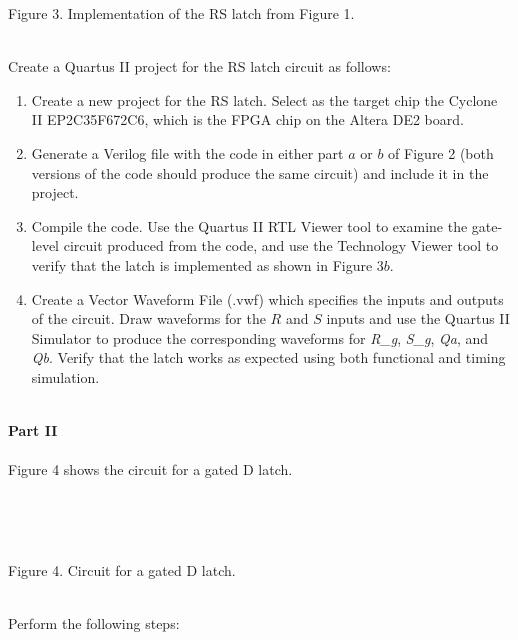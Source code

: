 \documentclass[epsfig,10pt,fullpage]{article}
\begin{document}
\begin{figure}[H]
\scriptsize
\centerline{
\hbox{}}
\end{figure}
\centerline{Figure 3.  Implementation of the RS latch from Figure 1.}
~\\

Create a Quartus II project for the RS latch circuit as follows:

\begin{enumerate}
\item Create a new project for the RS latch. Select as the target chip the 
Cyclone II EP2C35F672C6, which is the FPGA chip on the Altera DE2 board. 
\item Generate a Verilog file with the code in either part $a$ or $b$ of Figure 2
(both versions of the code should produce the same circuit) and include it in the project. 
\item Compile the code. Use the Quartus II RTL Viewer tool to examine the gate-level
circuit produced from the code, and use the Technology Viewer tool 
to verify that the latch is implemented as shown in Figure 3$b$.
\item Create a Vector Waveform File (.vwf) which specifies the inputs and outputs
of the circuit. Draw waveforms for the $R$ and $S$ inputs and use the Quartus II Simulator to
produce the corresponding waveforms for {\it R\_g}, {\it S\_g}, {\it Qa}, and {\it Qb}.
Verify that the latch works as expected using both functional and timing simulation.
\end{enumerate}

~\\
\noindent
{\bf Part II}
~\\
~\\
\noindent
Figure 4 shows the circuit for a gated D latch.

~\\
\begin{figure}[H]
\scriptsize
\centerline{
\hbox{}}
\end{figure}
~\\
\centerline{Figure 4.  Circuit for a gated D latch.}
~\\

\noindent
Perform the following steps:
\end{document}
